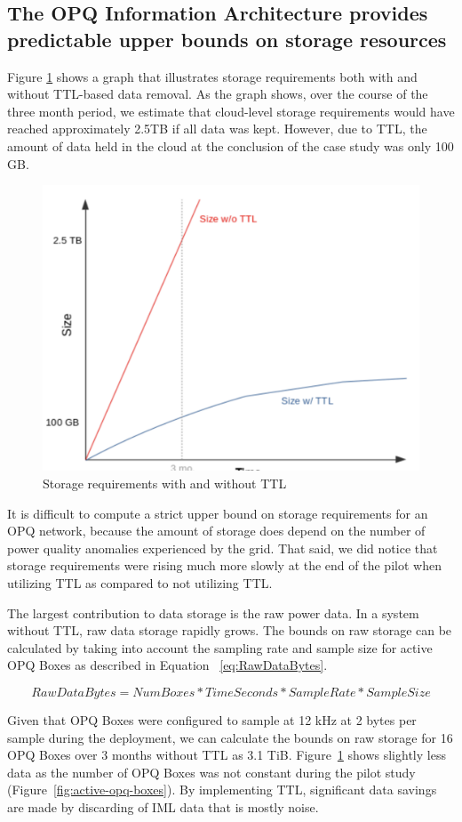 \subsection{The OPQ Information Architecture provides predictable upper bounds on storage resources}

Figure \ref{fig:data-management-graph} shows a graph that illustrates storage requirements both with and without TTL-based data removal.  As the graph shows, over the course of the three month period, we estimate that cloud-level storage requirements would have reached approximately 2.5TB if all data was kept.  However, due to TTL, the amount of data held in the cloud at the conclusion of the case study was only 100 GB.

\begin{figure}[ht]
  \centering
	\includegraphics[width=0.4\linewidth]{images/pilot/data-management-graph.png}
	\caption{Storage requirements with and without TTL}
	\label{fig:data-management-graph}
\end{figure}

It is difficult to compute a strict upper bound on storage requirements for an OPQ network, because the amount of storage does depend on the number of power quality anomalies experienced by the grid. That said, we did notice that storage requirements were rising much more slowly at the end of the pilot when utilizing TTL as compared to not utilizing TTL.

The largest contribution to data storage is the raw power data. In a system without TTL, raw data storage rapidly grows. The bounds on raw storage can be calculated by taking into account the sampling rate and sample size for active OPQ Boxes as described in Equation ~\ref{eq:RawDataBytes}.

\begin{equation}
    RawDataBytes = NumBoxes * TimeSeconds * SampleRate * SampleSize
    \label{eq:RawDataBytes}
\end{equation}

Given that OPQ Boxes were configured to sample at 12 kHz at 2 bytes per sample during the deployment, we can calculate the bounds on raw storage for 16 OPQ Boxes over 3 months without TTL as 3.1 TiB. Figure~\ref{fig:data-management-graph} shows slightly less data as the number of OPQ Boxes was not constant during the pilot study (Figure~\ref{fig:active-opq-boxes}). By implementing TTL, significant data savings are made by discarding of IML data that is mostly noise.

